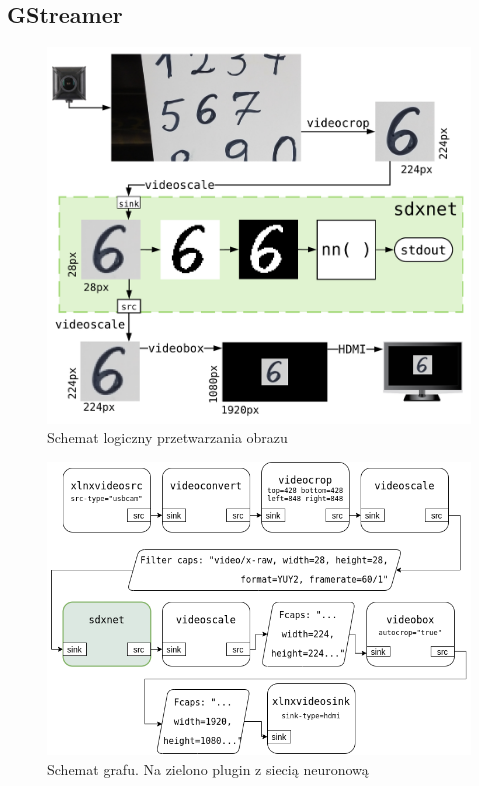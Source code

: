 \documentclass[12pt, oneside, a4paper]{article}
\begin{document}
\subsection{GStreamer}
\begin{figure}[h]
  \centering
  \includegraphics[scale=0.24]{figures/image_flow.png}
  \caption{Schemat logiczny przetwarzania obrazu}\label{fig:image_flow}
\end{figure}
\begin{figure}[h]
  \centering
  \includegraphics[scale=0.5625]{figures/pipeline.png}
  \caption{Schemat grafu. Na zielono plugin z siecią neuronową}\label{fig:pipeline}
\end{figure}
\end{document}
